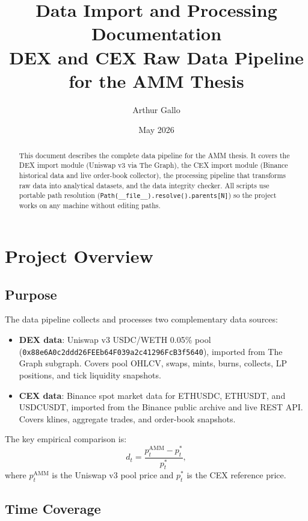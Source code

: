 \documentclass[11pt,a4paper]{article}
\title{Data Import and Processing Documentation\\
\large DEX and CEX Raw Data Pipeline for the AMM Thesis}
\author{Arthur Gallo}
\date{May 2026}
\begin{document}
\maketitle

\begin{abstract}
This document describes the complete data pipeline for the AMM thesis. It covers the DEX import module (Uniswap v3 via The Graph), the CEX import module (Binance historical data and live order-book collector), the processing pipeline that transforms raw data into analytical datasets, and the data integrity checker. All scripts use portable path resolution (\texttt{Path(\_\_file\_\_).resolve().parents[N]}) so the project works on any machine without editing paths.
\end{abstract}

\tableofcontents
\newpage

\section{Project Overview}

\subsection{Purpose}

The data pipeline collects and processes two complementary data sources:

\begin{itemize}
    \item \textbf{DEX data}: Uniswap v3 USDC/WETH 0.05\% pool (\texttt{0x88e6A0c2ddd26FEEb64F039a2c41296FcB3f5640}), imported from The Graph subgraph. Covers pool OHLCV, swaps, mints, burns, collects, LP positions, and tick liquidity snapshots.
    \item \textbf{CEX data}: Binance spot market data for ETHUSDC, ETHUSDT, and USDCUSDT, imported from the Binance public archive and live REST API. Covers klines, aggregate trades, and order-book snapshots.
\end{itemize}

The key empirical comparison is:
\[
  d_t = \frac{p^{\mathrm{AMM}}_t - p^{*}_t}{p^{*}_t},
\]
where $p^{\mathrm{AMM}}_t$ is the Uniswap v3 pool price and $p^{*}_t$ is the CEX reference price.

\subsection{Time Coverage}
\end{document}
